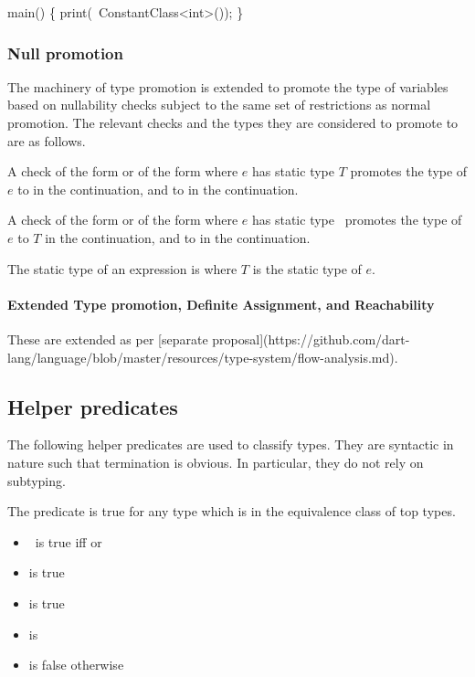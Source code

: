 \documentclass[makeidx]{article}
\begin{document}
{\begin{dartCode}
\VOID{} main() \{
  print(\CONST\ ConstantClass<int>());
\}
\end{dartCode}

\subsubsection{Null promotion}

The machinery of type promotion is extended to promote the type of variables
based on nullability checks subject to the same set of restrictions as normal
promotion.  The relevant checks and the types they are considered to promote to
are as follows.

A check of the form  or of the form  where $e$ has static
type $T$ promotes the type of $e$ to  in the  continuation, and to
 in the  continuation.

A check of the form  or of the form  where $e$ has static
type \ promotes the type of $e$ to $T$ in the  continuation, and to
 in the  continuation.

The static type of an expression  is  where $T$ is the
static type of $e$.

\paragraph{Extended Type promotion, Definite Assignment, and Reachability}

These are extended as per
[separate proposal](https://github.com/dart-lang/language/blob/master/resources/type-system/flow-analysis.md).

\subsection{Helper predicates}

The following helper predicates are used to classify types. They are syntactic
in nature such that termination is obvious. In particular, they do not rely on
subtyping.

The \IsTopTypeName{} predicate is true for any type which is in the equivalence class of
top types.

\begin{itemize}
\item {}\ is true iff  or 
\item \IsTopType{\DYNAMIC} is true
\item \IsTopType{\VOID} is true
\item {} is 
\item {} is false otherwise
\end{itemize}

}
\end{document}
